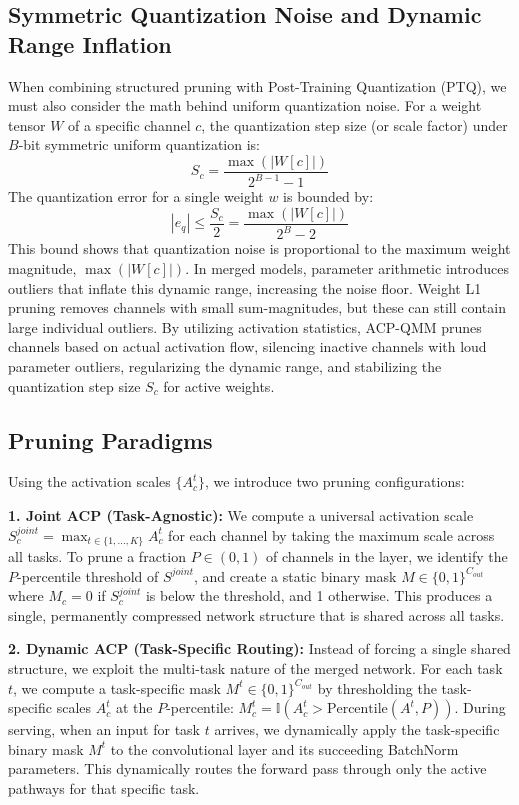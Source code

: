 \documentclass{article}
\theoremstyle{plain}
\theoremstyle{definition}
\theoremstyle{remark}
\begin{document}
\subsection{Symmetric Quantization Noise and Dynamic Range Inflation}
When combining structured pruning with Post-Training Quantization (PTQ), we must also consider the math behind uniform quantization noise. For a weight tensor $W$ of a specific channel $c$, the quantization step size (or scale factor) under $B$-bit symmetric uniform quantization is:
\begin{equation}
    S_c = \frac{\max(|W[c]|)}{2^{B-1} - 1}
\end{equation}
The quantization error for a single weight $w$ is bounded by:
\begin{equation}
    |e_q| \le \frac{S_c}{2} = \frac{\max(|W[c]|)}{2^B - 2}
\end{equation}
This bound shows that quantization noise is proportional to the maximum weight magnitude, $\max(|W[c]|)$. In merged models, parameter arithmetic introduces outliers that inflate this dynamic range, increasing the noise floor. Weight L1 pruning removes channels with small sum-magnitudes, but these can still contain large individual outliers. By utilizing activation statistics, ACP-QMM prunes channels based on actual activation flow, silencing inactive channels with loud parameter outliers, regularizing the dynamic range, and stabilizing the quantization step size $S_c$ for active weights.

\subsection{Pruning Paradigms}
Using the activation scales $\{A^t_c\}$, we introduce two pruning configurations:

\textbf{1. Joint ACP (Task-Agnostic):} We compute a universal activation scale $S^{joint}_c = \max_{t \in \{1, \dots, K\}} A^t_c$ for each channel by taking the maximum scale across all tasks. To prune a fraction $P \in (0, 1)$ of channels in the layer, we identify the $P$-percentile threshold of $S^{joint}$, and create a static binary mask $M \in \{0, 1\}^{C_{out}}$ where $M_c = 0$ if $S^{joint}_c$ is below the threshold, and 1 otherwise. This produces a single, permanently compressed network structure that is shared across all tasks.

\textbf{2. Dynamic ACP (Task-Specific Routing):} Instead of forcing a single shared structure, we exploit the multi-task nature of the merged network. For each task $t$, we compute a task-specific mask $M^t \in \{0, 1\}^{C_{out}}$ by thresholding the task-specific scales $A^t_c$ at the $P$-percentile: $M^t_c = \mathbb{I}\left(A^t_c > \text{Percentile}(A^t, P)\right)$. During serving, when an input for task $t$ arrives, we dynamically apply the task-specific binary mask $M^t$ to the convolutional layer and its succeeding BatchNorm parameters. This dynamically routes the forward pass through only the active pathways for that specific task.
\end{document}
